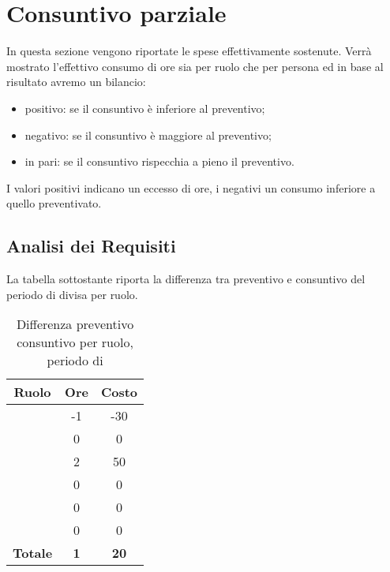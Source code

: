 \section{Consuntivo parziale}\label{consuntivi}
In questa sezione vengono riportate le spese effettivamente sostenute. Verrà mostrato l'effettivo consumo di ore sia per ruolo che per persona ed in base al risultato avremo un bilancio:
\begin{itemize}
	\item positivo: se il consuntivo è inferiore al preventivo;
	\item negativo: se il consuntivo è maggiore al preventivo;
	\item in pari: se il consuntivo rispecchia a pieno il preventivo.
\end{itemize}
I valori positivi indicano un eccesso di ore, i negativi un consumo inferiore a quello preventivato.

\subsection{Analisi dei Requisiti}
La tabella sottostante riporta la differenza tra preventivo e consuntivo del periodo di \AR{} divisa per ruolo.
\begin{table}[H]
	\centering
	\begin{tabular}{|c|c|c|}
		\hline
		\textbf{Ruolo} &
		\textbf{Ore} &
		\textbf{Costo} \\
		\hline
		\Responsabile & -1 & -30\\
		\hline
		\Amministratore & 0 & 0\\
		\hline
		\Analista & 2 & 50\\
		\hline
		\Progettista & 0 & 0 \\
		\hline
		\Verificatore & 0 & 0\\
		\hline
		\Programmatore & 0 & 0 \\
		\hline
		\textbf{Totale} & \textbf{1} & \textbf{20} \\
		\hline
	\end{tabular}
	\caption{Differenza preventivo consuntivo per ruolo, periodo di \AR}
\end{table}

